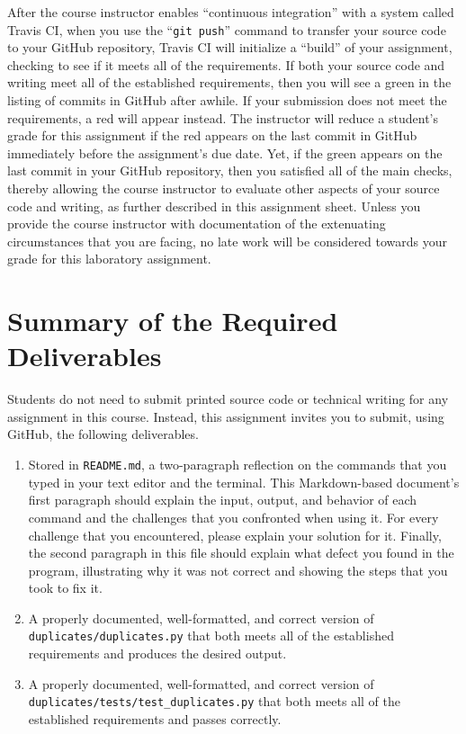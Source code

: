 \documentclass[11pt]{article}
\newcommand{\mainprogramsource}{\lstinline{duplicates/duplicates.py}}
\newcommand{\maintestsource}{\lstinline{duplicates/tests/test_duplicates.py}}
\newcommand{\reflection}{\lstinline{README.md}}
\newcommand{\gitpush}{\command{git push}}
\newcommand{\command}[1]{``\lstinline{#1}''}
\newcommand{\step}[1]{``{#1}''}
\newcommand{\checkmark}{\ding{51}}
\newcommand{\naughtmark}{\ding{55}}
\begin{document}
After the course instructor enables \step{continuous integration} with a system called Travis CI, when you use the
\gitpush{} command to transfer your source code to your GitHub repository, Travis CI will initialize a \step{build} of
your assignment, checking to see if it meets all of the requirements. If both your source code and writing meet all of
the established requirements, then you will see a green \checkmark{} in the listing of commits in GitHub after awhile.
If your submission does not meet the requirements, a red \naughtmark{} will appear instead. The instructor will reduce a
student's grade for this assignment if the red \naughtmark{} appears on the last commit in GitHub immediately before the
assignment's due date. Yet, if the green \checkmark{} appears on the last commit in your GitHub repository, then you
satisfied all of the main checks, thereby allowing the course instructor to evaluate other aspects of your source code
and writing, as further described in this assignment sheet. Unless you provide the course instructor with documentation
of the extenuating circumstances that you are facing, no late work will be considered towards your grade for this
laboratory assignment.

\section*{Summary of the Required Deliverables}

\noindent Students do not need to submit printed source code or technical writing for any assignment in this course.
Instead, this assignment invites you to submit, using GitHub, the following deliverables.

\begin{enumerate}

\setlength{\itemsep}{0in}

\item Stored in \reflection{}, a two-paragraph reflection on the commands that you typed in your text editor and the
  terminal. This Markdown-based document's first paragraph should explain the input, output, and behavior of each
  command and the challenges that you confronted when using it. For every challenge that you encountered, please explain
  your solution for it. Finally, the second paragraph in this file should explain what defect you found in the program,
  illustrating why it was not correct and showing the steps that you took to fix it.

\item A properly documented, well-formatted, and correct version of \mainprogramsource{} that both meets all of the
  established requirements and produces the desired output.

\item A properly documented, well-formatted, and correct version of \maintestsource{} that both meets all of the
  established requirements and passes correctly.

\end{enumerate}
\end{document}
